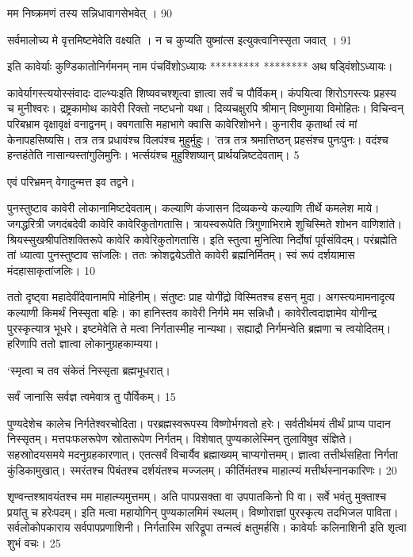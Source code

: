 मम निष्क्रमणं तस्य सन्निधावागसेभवेत् ।
90

 सर्वमालोच्य मे वृत्तमिष्टमेवेति वक्ष्यति ।
 न च कुप्यति युष्मांत्स
इत्युक्त्वानिस्सृता जवात् ।
91

 इति कावेर्याः कुण्डिकातोनिर्गमनम् नाम
पंचविंशोऽध्यायः
*********
********
अथ षड्विंशोऽध्यायः।

कावेर्यागस्त्ययोस्संवादः दाल्भ्यःइति शिष्यवचश्शृत्वा ज्ञात्वा सर्वं च पौर्विकम्।
 कंपयित्वा शिरोऽगस्त्यः प्रहस्य च मुनीश्वरः।
 द्रष्ट्रकामोथ कावेरी रिक्तो नष्टधनो यथा।
 दिव्यचक्षुरपि श्रीमान् विष्णुमाया विमोहितः।
 विचिन्वन् परिबभ्राम वृक्षावृक्षं वनाद्वनम्।
 क्वगतासि महाभागे क्वासि कावेरिशोभने।
 कुनारीव कृतार्था त्वं मां केनापहसिष्यसि।
 तत्र तत्र प्रधावंश्च विलपंश्च मुहुर्मुहुः।
 'तत्र तत्र श्रमात्तिष्ठन् प्रहसंश्च पुनःपुनः।
 वदंश्च हन्तहंतेति नासान्यस्तांगुलिमुनिः।
 भर्त्सयंश्च मुहुश्शिष्यान् प्रार्थयन्निष्टदेवताम्।
 5

  एवं परिभ्रमन् वेगादुन्मत्त इव तद्वने।

पुनस्तुष्टाव कावेरी लोकानामिष्टदेवताम्।
 कल्याणि कंजासन दिव्यकन्ये
कल्याणि तीर्थे कमलेश माये।
 जगद्धरित्री जगदंबदेवी कावेरि कावेरिकुतोगतासि।
 त्रायस्वरूपेति त्रिगुणाभिरामे
शुचिस्मिते शोभन वाणिशांते।
 श्रियस्सुखश्रीपतिशक्तिरूपे
कावेरि कावेरिकुतोगतासि।
 इति स्तुत्वा मुनित्विा निर्दोषां पूर्वसंविदम्।
 परंब्रह्मेति तां ध्यात्वा पुनस्तुष्टाव सांजलिः।
 ततः क्रोशद्वयेऽतीते कावेरी ब्रह्मनिर्मितम्।
 स्वं रूपं दर्शयामास मंदहासाकृतांजलिः।
 10

  ततो दृष्ट्वा महादेवींदेवानामपि मोहिनीम्।
 संतुष्टः प्राह योगींद्रो विस्मितश्च हसन् मुदा।
 अगस्त्यःमामनादृत्य कल्याणी किमर्थं निस्सृता बहिः।
 का हानिस्तव कावेरी निर्गमे मम सन्निधौ।
 कावेरीत्वदाज्ञामेव योगीन्द्र पुरस्कृत्यात्र भूधरे।
 इष्टमेवेति ते मत्वा निर्गतास्मीह नान्यथा।
 सह्याद्रौ निर्गमन्वेति ब्रह्मणा च त्वयोदितम्।
 हरिणापि ततो ज्ञात्वा लोकानुग्रहकाम्यया।
 
‘स्मृत्वा च तव संकेतं निस्सृता ब्रह्मभूधरात्।

सर्वं जानासि सर्वज्ञ त्वमेवात्र तु पौर्विकम्।
15

 पुण्यदेशेच कालेच निर्गतेश्वरचोदिता।
 परब्रह्मस्वरूपस्य विष्णोर्भगवतो हरेः।
 सर्वतीर्थमयं तीर्थं प्राप्य पादान निस्सृतम्।
 मत्तपःफलरूपेण स्रोतारूपेण निर्गतम्।
 विशेषात् पुण्यकालेस्मिन् तुलाविषुव संज्ञिते।
 सहस्राोदयसमये मदनुग्रहकारणात्।
 एतत्सर्वं विचार्यैव ब्रह्माख्यम् चाप्यगोत्तमम्।
 ज्ञात्वा तत्तीर्थसहिता निर्गता कुंडिकामुखात्।
 स्मरंतश्च पिबंतश्च दर्शयंतश्च मज्जलम्।
 कीर्तिमंतश्च माहात्म्यं मत्तीर्थस्नानकारिणः।
 20

  शृण्वन्तश्श्रावयंतश्च मम माहात्म्यमुत्तमम्।
 अति पापप्रसक्ता वा उपपातकिनो पि वा।
 सर्वे भवंतु मुक्ताश्च प्रयांतु च हरेःपदम्।
 इति मत्वा महायोगिन् पुण्यकालमिमं स्थलम्।
 विष्णोराज्ञां पुरस्कृत्य तदभिजल पाविता।
 सर्वलोकोपकाराय सर्वपापप्रणाशिनी।
 निर्गतास्मि सरिद्रूपा तन्मत्वं क्षतुमर्हसि।
 कावेर्याः कलिनाशिनी इति शृत्वा शुभं वचः।
 25

